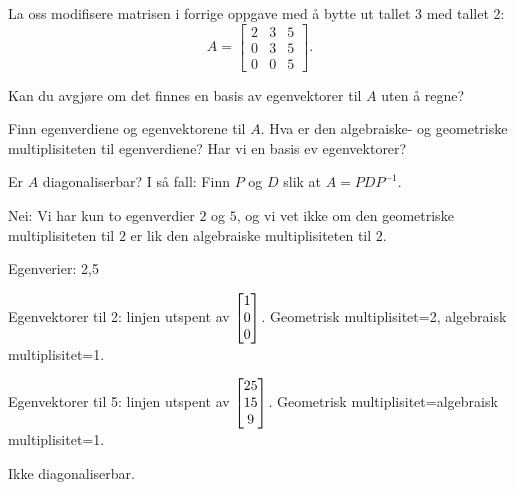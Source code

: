 \begin{oppgave}
La oss modifisere matrisen i forrige oppgave med å bytte ut tallet 3 med tallet 2: $$A=\begin{bmatrix}
2 & 3 & 5\\
0 & 3 & 5\\
0 & 0 & 5
\end{bmatrix}.$$ 

\begin{punkt}
Kan du avgjøre om det finnes en basis av egenvektorer til $A$ uten å regne?
\end{punkt}

\begin{punkt}
Finn egenverdiene og egenvektorene til $A$. Hva er den algebraiske- og geometriske multiplisiteten til egenverdiene? Har vi en basis ev egenvektorer?
\end{punkt}

\begin{punkt}
Er $A$ diagonaliserbar? I så fall: Finn $P$ og $D$ slik at $A=PDP^{-1}$.
\end{punkt}

\end{oppgave}


\begin{losning}
\begin{punkt}
Nei: Vi har kun to egenverdier $2$ og $5$, og vi vet ikke om den geometriske multiplisiteten til $2$ er lik den algebraiske multiplisiteten til $2$.
\end{punkt}

\begin{punkt}
Egenverier: 2,5

\noindent
Egenvektorer til  2: linjen utspent av $\begin{bmatrix} 1 \\ 0 \\ 0 \end{bmatrix}$. Geometrisk multiplisitet=2, algebraisk multiplisitet=1.


\noindent
Egenvektorer til  5: linjen utspent av $\begin{bmatrix} 25 \\ 15 \\ 9 \end{bmatrix}$. Geometrisk multiplisitet=algebraisk multiplisitet=1.


\end{punkt}

Ikke diagonaliserbar.

\end{losning}


